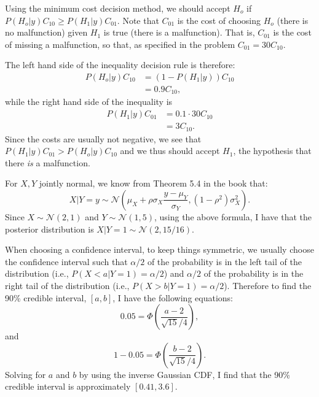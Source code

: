 \begin{problem}{15} Using the minimum cost decision method, we should accept $H_o$ if $P(H_o|y)C_{10} \ge P(H_1|y)C_{01}$.  Note that $C_{01}$ is the cost of choosing $H_o$ (there is no malfunction) given $H_1$ is true (there is a malfunction).  That is, $C_{01}$ is the cost of missing a malfunction, so that, as specified in the problem $C_{01} = 30 C_{10}$.  

The left hand side of the inequality decision rule is therefore:
\begin{align*}
P(H_o|y)C_{10}  &= (1 - P(H_1|y))C_{10} \\
& = 0.9C_{10},
\end{align*}
while the right hand side of the inequality is 
\begin{align*}
P(H_1|y)C_{01}  &= 0.1\cdot 30 C_{10} \\
& = 3 C_{10}.
\end{align*}
Since the costs are usually not negative, we see that $P(H_1|y)C_{01} >P(H_o|y)C_{10}$ and we thus should accept $H_1$, the hypothesis that there \textit{is} a malfunction.


\end{problem}

\begin{problem}{16}
For $X, Y$ jointly normal, we know from Theorem 5.4 in the book that:
\begin{equation*}
X|Y=y \sim \mathcal N \left (\mu_X+\rho \sigma_X\frac{y-\mu_Y}{\sigma_Y}, (1-\rho^2) \sigma_X^2  \right).
\end{equation*}
Since $X\sim \mathcal N(2,1)$ and $Y\sim \mathcal N(1,5)$, using the above formula, I have that the posterior distribution is $X|Y=1 \sim \mathcal N(2, 15/16)$.

When choosing a confidence interval, to keep things symmetric, we usually choose the confidence interval such that $\alpha/2$ of the probability is in the left tail of the distribution (i.e., $P(X<a|Y=1) = \alpha /2$) and $\alpha/2$ of the probability is in the right tail of the distribution (i.e., $P(X>b|Y=1) = \alpha /2$).  Therefore to find the 90\% credible interval, $[a, b]$, I have the following equations:
\begin{equation*}
0.05 = \Phi \left(\frac{a-2}{\sqrt{15}/4} \right),
\end{equation*}
and
\begin{equation*}
1 - 0.05 = \Phi \left(\frac{b-2}{\sqrt{15}/4} \right).
\end{equation*}
Solving for $a$ and $b$ by using the inverse Gaussian CDF, I find that the 90\% credible interval is approximately $[0.41, 3.6]$.



\end{problem} 

